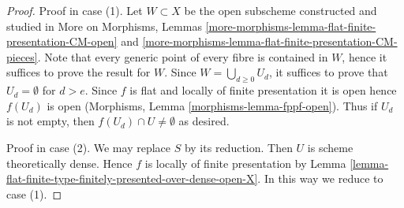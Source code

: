 \documentclass[10pt,a4paper]{amsart}
\theoremstyle{plain}
\theoremstyle{definition}
\theoremstyle{remark}
\numberwithin{equation}{subsection}
\begin{document}
\begin{proof}
Proof in case (1). Let $W \subset X$ be the open subscheme constructed
and studied in More on Morphisms, Lemmas
\ref{more-morphisms-lemma-flat-finite-presentation-CM-open} and
\ref{more-morphisms-lemma-flat-finite-presentation-CM-pieces}.
Note that every generic point of every fibre is contained in $W$,
hence it suffices to prove the result for $W$. Since
$W = \bigcup_{d \geq 0} U_d$, it suffices to prove that $U_d = \emptyset$
for $d > e$. Since $f$ is flat and locally of finite presentation it is open
hence $f(U_d)$ is open (Morphisms, Lemma \ref{morphisms-lemma-fppf-open}).
Thus if $U_d$ is not empty, then $f(U_d) \cap U \not = \emptyset$ as
desired.

\medskip\noindent
Proof in case (2). We may replace $S$ by its reduction. Then $U$ is
scheme theoretically dense. Hence $f$ is locally of finite presentation
by Lemma \ref{lemma-flat-finite-type-finitely-presented-over-dense-open-X}.
In this way we reduce to case (1).
\end{proof}
\end{document}
